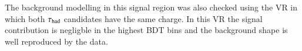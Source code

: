 The background modelling in this signal region was also checked using the VR in which both $\tau_\text{had}$ candidates have the same charge.
In this VR the signal contribution is negligble in the highest BDT bins and the background shape is well reproduced by the data.
